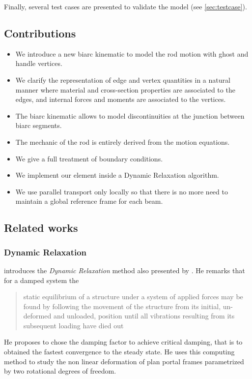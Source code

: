 Finally, several test cases are presented to validate the model (see \cref{sec:testcase}).

\subsection{Contributions}
\begin{itemize}
	\item We introduce a new  biarc kinematic to model the rod motion with ghost and handle vertices.
	\item We clarify the representation of edge and vertex quantities in a natural manner where material and cross-section properties are associated to the edges, and internal forces and moments are associated to the vertices.
	\item The biarc kinematic allows to model discontinuities at the junction between biarc segments.
	\item The mechanic of the rod is entirely derived from the motion equations.
	\item We give a full treatment of boundary conditions.
	\item We implement our element inside a Dynamic Relaxation algorithm.
	\item We use parallel transport only locally so that there is no more need to maintain a global reference frame for each beam.
\end{itemize}

\subsection{Related works}

\subsubsection{Dynamic Relaxation}

 introduces the \emph{Dynamic Relaxation} method also presented by . He remarks that for a damped system the \blockquote{static equilibrium of a structure under a system of applied forces may be found by following the movement of the structure from its initial, un-deformed and unloaded, position until all vibrations resulting from its subsequent loading have died out}. He proposes to chose the damping factor to achieve critical damping, that is to obtained the fastest convergence to the steady state. He uses this computing method to study the non linear deformation of plan portal frames parametrized by two rotational degrees of freedom.

